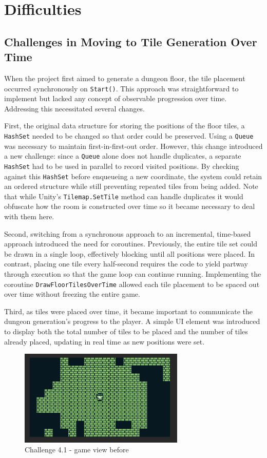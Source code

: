 \documentclass[a4paper, 12pt, one column, aas_macros]{article}
\begin{document}
\section{Difficulties}

\subsection{Challenges in Moving to Tile Generation Over Time}
When the project first aimed to generate a dungeon floor, the tile placement occurred synchronously on \texttt{Start()}. This approach was straightforward to implement but lacked any concept of observable progression over time. Addressing this necessitated several changes. 

First, the original data structure for storing the positions of the floor tiles, a \texttt{HashSet} needed to be changed so that order could be preserved. Using a \texttt{Queue} was necessary to maintain first-in-first-out order. However, this change introduced a new challenge: since a \texttt{Queue} alone does not handle duplicates, a separate \texttt{HashSet} had to be used in parallel to record visited positions. By checking against this \texttt{HashSet} before enqueueing a new coordinate, the system could retain an ordered structure while still preventing repeated tiles from being added. Note that while Unity's \texttt{Tilemap.SetTile} method can handle duplicates it would obfuscate how the room is constructed over time so it became necessary to deal with them here. 

Second, switching from a synchronous approach to an incremental, time-based approach introduced the need for coroutines. Previously, the entire tile set could be drawn in a single loop, effectively blocking until all positions were placed. In contrast, placing one tile every half-second requires the code to yield partway through execution so that the game loop can continue running. Implementing the coroutine \texttt{DrawFloorTilesOverTime} allowed each tile placement to be spaced out over time without freezing the entire game.

Third, as tiles were placed over time, it became important to communicate the dungeon generation’s progress to the player. A simple UI element was introduced to display both the total number of tiles to be placed and the number of tiles already placed, updating in real time as new positions were set.

\begin{figure}[htbp]
  \centering
  \includegraphics[width=0.7\textwidth]{images/difficulty-1-before.png}
  \caption{Challenge 4.1 - game view before}
  \label{fig:difficulty-1-before}
\end{figure}
\end{document}
